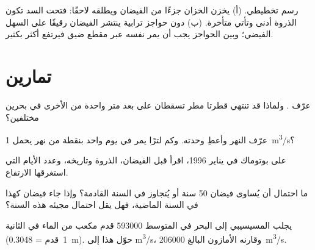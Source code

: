 \begin{omfigure}
{\small رسم تخطيطي. (أ) يخزن الخزان جزءًا من الفيضان ويطلقه
لاحقًا: فتحت السد تكون الذروة أدنى وتأتي متأخرة. (ب) دون حواجز ترابية
ينتشر الفيضان رقيقًا على السهل الفيضي؛ وبين الحواجز يجب أن يمر  نفسه
عبر مقطع ضيق فيرتفع أكثر بكثير.}
\end{omfigure}

\section{تمارين}

\begin{exercise}[$\star$]\label{exo:g10:drainage-basins:1}
عرّف  . ولماذا قد تنتهي قطرتا مطر تسقطان على بعد
متر واحدة من الأخرى في بحرين مختلفين؟
\end{exercise}

\begin{exercise}[$\star$]\label{exo:g10:drainage-basins:2}
عرّف  النهر وأعطِ وحدته. وكم لترًا يمر في يوم واحد بنقطة من نهر يحمل
\qty{1}{m^3/s}؟
\end{exercise}

\begin{exercise}[$\star$]\label{exo:g10:drainage-basins:3}
على  بوتوماك في يناير 1996، اقرأ  قبل
الفيضان،  الذروة وتاريخه، وعدد الأيام التي استغرقها
الارتفاع.
\end{exercise}

\begin{exercise}[$\star$]\label{exo:g10:drainage-basins:4}
ما احتمال أن يُساوى فيضان  \num{50} سنة أو يُتجاوز
في السنة القادمة؟ وإذا جاء فيضان كهذا في السنة الماضية، فهل يقل احتمال مجيئه هذه
السنة؟
\end{exercise}

\begin{exercise}[$\star$]\label{exo:g10:drainage-basins:5}
يجلب المسيسيبي إلى البحر في المتوسط \num{593000} قدم مكعب من الماء في
الثانية (\num{1}~قدم = \qty{0.3048}{m}). حوّل هذا 
إلى \unit{m^3/s}، وقارنه  الأمازون البالغ \qty{206000}{m^3/s}.
\end{exercise}

